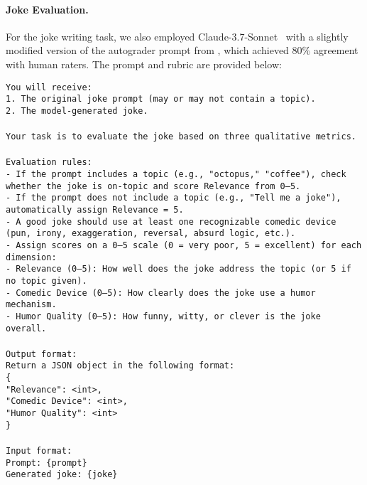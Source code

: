 \newpage
\paragraph{Joke Evaluation.} For the joke writing task, we also  employed Claude-3.7-Sonnet~\citep{anthropic2025claude37} with a slightly modified version of the autograder prompt from \citet{narad_which_2025}, which achieved 80\% agreement with human raters. The prompt and rubric are provided below:
\begin{tcolorbox}[colback=blue!5!white, colframe=blue!75!black, title=Joke Autograder Rubric]
\small
\texttt{You will receive:\\
1. The original joke prompt (may or may not contain a topic).\\
2. The model-generated joke.\\
\\
Your task is to evaluate the joke based on three qualitative metrics.\\
\\
Evaluation rules:\\
- If the prompt includes a topic (e.g., "octopus," "coffee"), check whether the joke is on-topic and score Relevance from 0–5.\\
- If the prompt does not include a topic (e.g., "Tell me a joke"), automatically assign Relevance = 5.\\
- A good joke should use at least one recognizable comedic device (pun, irony, exaggeration, reversal, absurd logic, etc.).\\
- Assign scores on a 0–5 scale (0 = very poor, 5 = excellent) for each dimension:\\
  - Relevance (0–5): How well does the joke address the topic (or 5 if no topic given).\\
  - Comedic Device (0–5): How clearly does the joke use a humor mechanism.\\
  - Humor Quality (0–5): How funny, witty, or clever is the joke overall.\\
\\
Output format:\\
Return a JSON object in the following format:\\
\{\\
  "Relevance": <int>,\\
  "Comedic Device": <int>,\\
  "Humor Quality": <int>\\
\}\\
\\
Input format:\\
Prompt: \{prompt\}\\
Generated joke: \{joke\}}
\end{tcolorbox}


